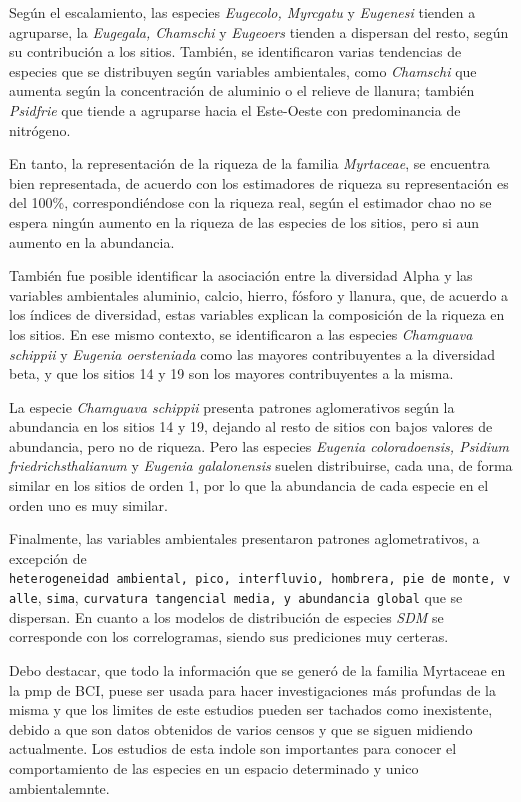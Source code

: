 \documentclass[11pt,]{article}
\begin{document}
Según el escalamiento, las especies \emph{Eugecolo, Myrcgatu} y
\emph{Eugenesi} tienden a agruparse, la \emph{Eugegala, Chamschi} y
\emph{Eugeoers} tienden a dispersan del resto, según su contribución a
los sitios. También, se identificaron varias tendencias de especies que
se distribuyen según variables ambientales, como \emph{Chamschi} que
aumenta según la concentración de aluminio o el relieve de llanura;
también \emph{Psidfrie} que tiende a agruparse hacia el Este-Oeste con
predominancia de nitrógeno.

En tanto, la representación de la riqueza de la familia
\emph{Myrtaceae}, se encuentra bien representada, de acuerdo con los
estimadores de riqueza su representación es del 100\%, correspondiéndose
con la riqueza real, según el estimador chao no se espera ningún aumento
en la riqueza de las especies de los sitios, pero si aun aumento en la
abundancia.

También fue posible identificar la asociación entre la diversidad Alpha
y las variables ambientales aluminio, calcio, hierro, fósforo y llanura,
que, de acuerdo a los índices de diversidad, estas variables explican la
composición de la riqueza en los sitios. En ese mismo contexto, se
identificaron a las especies \emph{Chamguava schippii} y \emph{Eugenia
oersteniada} como las mayores contribuyentes a la diversidad beta, y que
los sitios 14 y 19 son los mayores contribuyentes a la misma.

La especie \emph{Chamguava schippii} presenta patrones aglomerativos
según la abundancia en los sitios 14 y 19, dejando al resto de sitios
con bajos valores de abundancia, pero no de riqueza. Pero las especies
\emph{Eugenia coloradoensis, Psidium friedrichsthalianum} y
\emph{Eugenia galalonensis} suelen distribuirse, cada una, de forma
similar en los sitios de orden 1, por lo que la abundancia de cada
especie en el orden uno es muy similar.

Finalmente, las variables ambientales presentaron patrones
aglometrativos, a excepción de
\texttt{heterogeneidad\ ambiental,\ pico,\ interfluvio,\ hombrera,\ pie\ de\ monte,\ valle},
\texttt{sima},
\texttt{curvatura\ tangencial\ media,\ y\ abundancia\ global} que se
dispersan. En cuanto a los modelos de distribución de especies
\emph{SDM} se corresponde con los correlogramas, siendo sus prediciones
muy certeras.

Debo destacar, que todo la información que se generó de la familia
Myrtaceae en la pmp de BCI, puese ser usada para hacer investigaciones
más profundas de la misma y que los limites de este estudios pueden ser
tachados como inexistente, debido a que son datos obtenidos de varios
censos y que se siguen midiendo actualmente. Los estudios de esta indole
son importantes para conocer el comportamiento de las especies en un
espacio determinado y unico ambientalemnte.
\end{document}
